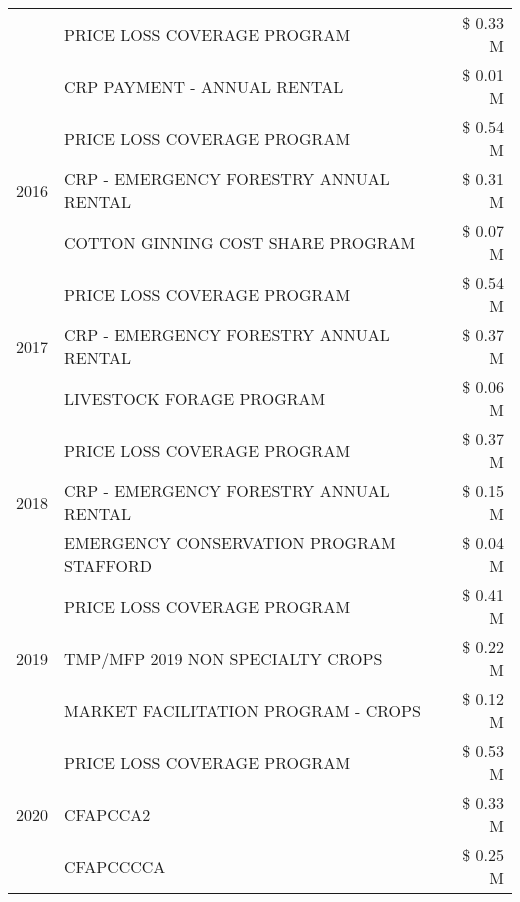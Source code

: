\begin{tabular}{llr}
 & PRICE LOSS COVERAGE PROGRAM & \$ 0.33 M \\
 & CRP PAYMENT - ANNUAL RENTAL & \$ 0.01 M \\
\cline{1-3}
\multirow[t]{3}{*}{2016} & PRICE LOSS COVERAGE PROGRAM & \$ 0.54 M \\
 & CRP - EMERGENCY FORESTRY ANNUAL RENTAL & \$ 0.31 M \\
 & COTTON GINNING COST SHARE PROGRAM & \$ 0.07 M \\
\cline{1-3}
\multirow[t]{3}{*}{2017} & PRICE LOSS COVERAGE PROGRAM & \$ 0.54 M \\
 & CRP - EMERGENCY FORESTRY ANNUAL RENTAL & \$ 0.37 M \\
 & LIVESTOCK FORAGE PROGRAM & \$ 0.06 M \\
\cline{1-3}
\multirow[t]{3}{*}{2018} & PRICE LOSS COVERAGE PROGRAM & \$ 0.37 M \\
 & CRP - EMERGENCY FORESTRY ANNUAL RENTAL & \$ 0.15 M \\
 & EMERGENCY CONSERVATION PROGRAM STAFFORD & \$ 0.04 M \\
\cline{1-3}
\multirow[t]{3}{*}{2019} & PRICE LOSS COVERAGE PROGRAM & \$ 0.41 M \\
 & TMP/MFP 2019 NON SPECIALTY CROPS & \$ 0.22 M \\
 & MARKET FACILITATION PROGRAM - CROPS & \$ 0.12 M \\
\cline{1-3}
\multirow[t]{3}{*}{2020} & PRICE LOSS COVERAGE PROGRAM & \$ 0.53 M \\
 & CFAPCCA2 & \$ 0.33 M \\
 & CFAPCCCCA & \$ 0.25 M \\
\cline{1-3}
\bottomrule
\end{tabular}
